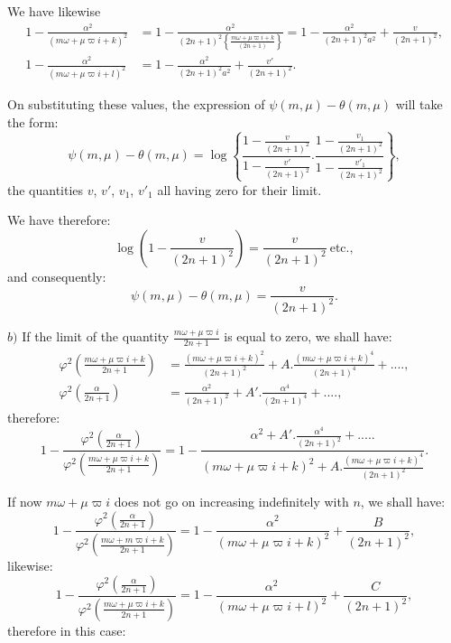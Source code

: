\documentclass{article}
\begin{document}
We have likewise
\[ \begin{aligned}1-\frac{\alpha^{2}}{(m\omega+\mu\varpi i+k)^{2}}&=1-\frac{\alpha^{2}}{(2n+1)^{2}\left\{\frac{m\omega+\mu\varpi i+k}{(2n+1)}\right\}}=1-\frac{\alpha^{2}}{(2n+1)^{2}a^{2}}+\frac{v}{(2n+1)^{2}},\\ 1-\frac{\alpha^{2}}{(m\omega+\mu\varpi i+l)^{2}}&=1-\frac{\alpha^{2}}{(2n+1)^{2}a^{2}}+\frac{v'}{(2n+1)^{2}}.\end{aligned} \]

On substituting these values, the expression of $\psi(m,\mu)-\theta(m,\mu)$ will take the form:
\[ \psi(m,\mu)-\theta(m,\mu)=\log\left\{\frac{1-\frac{v}{(2n+1)^{2}}}{1-\frac{v'}{(2n+1)^{2}}}.\frac{1-\frac{v_{1}}{(2n+1)^{2}}}{1-\frac{v'_{1}}{(2n+1)^{2}}}\right\}, \]
the quantities $v$, $v'$, $v_{1}$, $v'_{1}$ all having zero for their limit.

We have therefore:
\[ \log\left(1-\frac{v}{(2n+1)^{2}}\right)=\frac{v}{(2n+1)^{2}}\ \text{etc.}, \]
and consequently:
\[ \psi(m,\mu)-\theta(m,\mu)=\frac{v}{(2n+1)^{2}}. \]

$b)$ If the limit of the quantity $\frac{m\omega+\mu\varpi i}{2n+1}$ is equal to zero, we shall have:
\[ \begin{aligned}\varphi^{2}\left(\frac{m\omega+\mu\varpi i+k}{2n+1}\right)&=\frac{(m\omega+\mu\varpi i+k)^{2}}{(2n+1)^{2}}+A.\frac{(m\omega+\mu\varpi i+k)^{4}}{(2n+1)^{4}}+....,\\ \varphi^{2}\left(\frac{\alpha}{2n+1}\right)&=\frac{\alpha^{2}}{(2n+1)^{2}}+A'.\frac{\alpha^{4}}{(2n+1)^{4}}+....,\end{aligned} \]
therefore:
\[ 1-\frac{\varphi^{2}\left(\frac{\alpha}{2n+1}\right)}{\varphi^{2}\left(\frac{m\omega+\mu\varpi i+k}{2n+1}\right)}=1-\frac{\alpha^{2}+A'.\frac{\alpha^{4}}{(2n+1)^{2}}+.....}{(m\omega+\mu\varpi i+k)^{2}+A.\frac{(m\omega+\mu\varpi i+k)^{4}}{(2n+1)^{2}}}. \]

If now $m\omega+\mu\varpi i$ does not go on increasing indefinitely with $n$, we shall have:
\[ 1-\frac{\varphi^{2}\left(\frac{\alpha}{2n+1}\right)}{\varphi^{2}\left(\frac{m\omega+m\varpi i+k}{2n+1}\right)}=1-\frac{\alpha^{2}}{(m\omega+\mu\varpi i+k)^{2}}+\frac{B}{(2n+1)^{2}}, \]
likewise:
\[ 1-\frac{\varphi^{2}\left(\frac{\alpha}{2n+1}\right)}{\varphi^{2}\left(\frac{m\omega+\mu\varpi i+k}{2n+1}\right)}=1-\frac{\alpha^{2}}{(m\omega+\mu\varpi i+l)^{2}}+\frac{C}{(2n+1)^{2}}, \]
therefore in this case:
\end{document}
